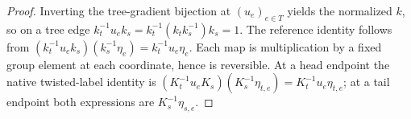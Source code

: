 \begin{proof}\leanok
    Inverting the tree-gradient bijection at $(u_e)_{e\in T}$ yields
    the normalized $k$, so on a tree edge
    $k_t^{-1}u_ek_s=k_t^{-1}(k_tk_s^{-1})k_s=1$.
    The reference identity follows from
    $(k_t^{-1}u_ek_s)(k_s^{-1}\eta_e)=k_t^{-1}u_e\eta_e$.
    Each map is multiplication by a fixed group element at each
    coordinate, hence is reversible. At a head endpoint the native
    twisted-label identity is
    $(K_t^{-1}u_eK_s)(K_s^{-1}\eta_{t,e})
        =K_t^{-1}u_e\eta_{t,e}$;
    at a tail endpoint both expressions are $K_s^{-1}\eta_{s,e}$.
\end{proof}
